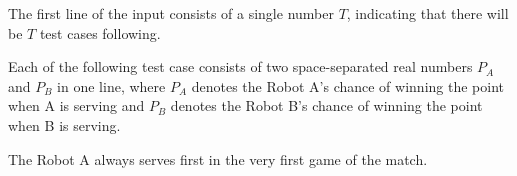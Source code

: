 The first line of the input consists of a single number $T$, indicating
that there will be $T$ test cases following.

Each of the following test case consists of two space-separated real numbers 
$P_A$ and $P_B$ in one line, where $P_A$ denotes the Robot A's chance of 
winning the point when A is serving and $P_B$ denotes the Robot B's chance of 
winning the point when B is serving.

The Robot A always serves first in the very first game of the match.
